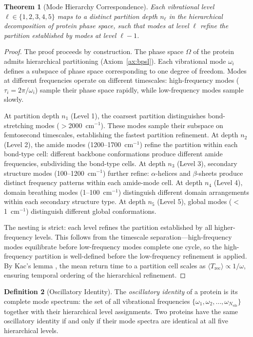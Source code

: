 \documentclass[11pt,twocolumn,a4paper]{article}
\newtheorem{theorem}{Theorem}[section]
\theoremstyle{definition}
\newtheorem{definition}[theorem]{Definition}
\theoremstyle{remark}
\newcommand{\Nvib}{N_{\mathrm{vib}}}
\begin{document}
\begin{theorem}[Mode Hierarchy Correspondence]
\label{thm:hierarchy}
Each vibrational level $\ell \in \{1,2,3,4,5\}$ maps to a distinct partition depth $n_\ell$ in the hierarchical decomposition of protein phase space, such that modes at level $\ell$ refine the partition established by modes at level $\ell - 1$.
\end{theorem}

\begin{proof}
The proof proceeds by construction. The phase space $\Omega$ of the protein admits hierarchical partitioning (Axiom~\ref{ax:bpsl}). Each vibrational mode $\omega_i$ defines a subspace of phase space corresponding to one degree of freedom. Modes at different frequencies operate on different timescales: high-frequency modes ($\tau_i = 2\pi/\omega_i$) sample their phase space rapidly, while low-frequency modes sample slowly.

At partition depth $n_1$ (Level 1), the coarsest partition distinguishes bond-stretching modes ($>$2000~cm$^{-1}$). These modes sample their subspace on femtosecond timescales, establishing the fastest partition refinement. At depth $n_2$ (Level 2), the amide modes (1200--1700~cm$^{-1}$) refine the partition within each bond-type cell: different backbone conformations produce different amide frequencies, subdividing the bond-type cells. At depth $n_3$ (Level 3), secondary structure modes (100--1200~cm$^{-1}$) further refine: $\alpha$-helices and $\beta$-sheets produce distinct frequency patterns within each amide-mode cell. At depth $n_4$ (Level 4), domain breathing modes (1--100~cm$^{-1}$) distinguish different domain arrangements within each secondary structure type. At depth $n_5$ (Level 5), global modes ($<$1~cm$^{-1}$) distinguish different global conformations.

The nesting is strict: each level refines the partition established by all higher-frequency levels. This follows from the timescale separation---high-frequency modes equilibrate before low-frequency modes complete one cycle, so the high-frequency partition is well-defined before the low-frequency refinement is applied. By Kac's lemma \citep{kac1947}, the mean return time to a partition cell scales as $\langle T_{\mathrm{rec}} \rangle \propto 1/\omega$, ensuring temporal ordering of the hierarchical refinement.
\end{proof}

\begin{definition}[Oscillatory Identity]
\label{def:osc_identity}
The \emph{oscillatory identity} of a protein is its complete mode spectrum: the set of all vibrational frequencies $\{\omega_1, \omega_2, \ldots, \omega_{\Nvib}\}$ together with their hierarchical level assignments. Two proteins have the same oscillatory identity if and only if their mode spectra are identical at all five hierarchical levels.
\end{definition}
\end{document}
